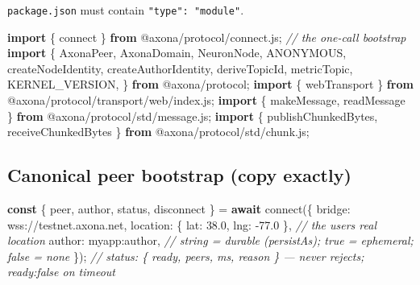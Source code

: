 \documentclass[
  nobib]{tufte-handout}
\newenvironment{Shaded}{}{}
\newcommand{\CommentTok}[1]{\textcolor[rgb]{0.38,0.63,0.69}{\textit{#1}}}
\newcommand{\ControlFlowTok}[1]{\textcolor[rgb]{0.00,0.44,0.13}{\textbf{#1}}}
\newcommand{\DataTypeTok}[1]{\textcolor[rgb]{0.56,0.13,0.00}{#1}}
\newcommand{\FloatTok}[1]{\textcolor[rgb]{0.25,0.63,0.44}{#1}}
\newcommand{\FunctionTok}[1]{\textcolor[rgb]{0.02,0.16,0.49}{#1}}
\newcommand{\ImportTok}[1]{\textcolor[rgb]{0.00,0.50,0.00}{\textbf{#1}}}
\newcommand{\KeywordTok}[1]{\textcolor[rgb]{0.00,0.44,0.13}{\textbf{#1}}}
\newcommand{\NormalTok}[1]{#1}
\newcommand{\OperatorTok}[1]{\textcolor[rgb]{0.40,0.40,0.40}{#1}}
\newcommand{\StringTok}[1]{\textcolor[rgb]{0.25,0.44,0.63}{#1}}
\newcounter{none} %
\begin{document}
\texttt{package.json} must contain \texttt{"type":\ "module"}.

\begin{Shaded}
\begin{Highlighting}[]
\ImportTok{import}\NormalTok{ \{ connect \} }\ImportTok{from} \StringTok{\textquotesingle{}@axona/protocol/connect.js\textquotesingle{}}\OperatorTok{;}   \CommentTok{// the one{-}call bootstrap}
\ImportTok{import}\NormalTok{ \{}
\NormalTok{  AxonaPeer}\OperatorTok{,}\NormalTok{ AxonaDomain}\OperatorTok{,}\NormalTok{ NeuronNode}\OperatorTok{,}\NormalTok{ ANONYMOUS}\OperatorTok{,}
\NormalTok{  createNodeIdentity}\OperatorTok{,}\NormalTok{ createAuthorIdentity}\OperatorTok{,}
\NormalTok{  deriveTopicId}\OperatorTok{,}\NormalTok{ metricTopic}\OperatorTok{,}\NormalTok{ KERNEL\_VERSION}\OperatorTok{,}
\NormalTok{\} }\ImportTok{from} \StringTok{\textquotesingle{}@axona/protocol\textquotesingle{}}\OperatorTok{;}
\ImportTok{import}\NormalTok{ \{ webTransport \} }\ImportTok{from} \StringTok{\textquotesingle{}@axona/protocol/transport/web/index.js\textquotesingle{}}\OperatorTok{;}
\ImportTok{import}\NormalTok{ \{ makeMessage}\OperatorTok{,}\NormalTok{ readMessage \} }\ImportTok{from} \StringTok{\textquotesingle{}@axona/protocol/std/message.js\textquotesingle{}}\OperatorTok{;}
\ImportTok{import}\NormalTok{ \{ publishChunkedBytes}\OperatorTok{,}\NormalTok{ receiveChunkedBytes \} }\ImportTok{from} \StringTok{\textquotesingle{}@axona/protocol/std/chunk.js\textquotesingle{}}\OperatorTok{;}
\end{Highlighting}
\end{Shaded}

\subsection{Canonical peer bootstrap (copy
exactly)}\label{canonical-peer-bootstrap-copy-exactly}

\begin{Shaded}
\begin{Highlighting}[]
\KeywordTok{const}\NormalTok{ \{ peer}\OperatorTok{,}\NormalTok{ author}\OperatorTok{,}\NormalTok{ status}\OperatorTok{,}\NormalTok{ disconnect \} }\OperatorTok{=} \ControlFlowTok{await} \FunctionTok{connect}\NormalTok{(\{}
  \DataTypeTok{bridge}\OperatorTok{:}   \StringTok{\textquotesingle{}wss://testnet.axona.net\textquotesingle{}}\OperatorTok{,}
  \DataTypeTok{location}\OperatorTok{:}\NormalTok{ \{ }\DataTypeTok{lat}\OperatorTok{:} \FloatTok{38.0}\OperatorTok{,} \DataTypeTok{lng}\OperatorTok{:} \OperatorTok{{-}}\FloatTok{77.0}\NormalTok{ \}}\OperatorTok{,}   \CommentTok{// the user\textquotesingle{}s real location}
  \DataTypeTok{author}\OperatorTok{:}   \StringTok{\textquotesingle{}myapp:author\textquotesingle{}}\OperatorTok{,}              \CommentTok{// string = durable (persistAs); true = ephemeral; false = none}
\NormalTok{\})}\OperatorTok{;}
\CommentTok{// status: \{ ready, peers, ms, reason \} — never rejects; ready:false on timeout}
\end{Highlighting}
\end{Shaded}
\end{document}
